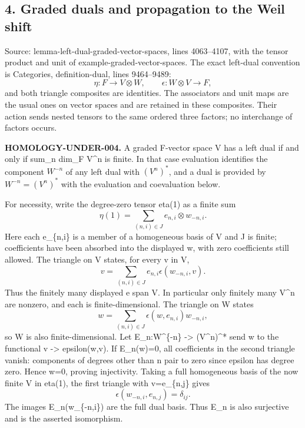 \documentclass[11pt]{article}
\begin{document}
\subsection{4. Graded duals and propagation to the Weil shift}\label{note-03-graded-duals-and-propagation-to-the-weil-shift}

Source: lemma-left-dual-graded-vector-spaces, lines 4063--4107, with the tensor product and unit of example-graded-vector-spaces. The exact left-dual convention is Categories, definition-dual, lines 9464--9489: \[
\eta:F\longrightarrow V\otimes W,\qquad
\epsilon:W\otimes V\longrightarrow F,
\] and both triangle composites are identities. The associators and unit maps are the usual ones on vector spaces and are retained in these composites. Their action sends nested tensors to the same ordered three factors; no interchange of factors occurs.

\textbf{HOMOLOGY-UNDER-004.} A graded F-vector space V has a left dual if and only if sum\_n dim\_F V\^{}n is finite. In that case evaluation identifies the component \(W^{-n}\) of any left dual with \((V^n)^*\), and a dual is provided by \(W^{-n}=(V^n)^*\) with the evaluation and coevaluation below.

For necessity, write the degree-zero tensor eta(1) as a finite sum \[
\eta(1)=\sum_{(n,i)\in J} e_{n,i}\otimes w_{-n,i}.
\] Here each e\_\{n,i\} is a member of a homogeneous basis of V and J is finite; coefficients have been absorbed into the displayed w, with zero coefficients still allowed. The triangle on V states, for every v in V, \[
v=\sum_{(n,i)\in J}e_{n,i}\epsilon(w_{-n,i},v).
\] Thus the finitely many displayed e span V. In particular only finitely many V\^{}n are nonzero, and each is finite-dimensional. The triangle on W states \[
w=\sum_{(n,i)\in J}\epsilon(w,e_{n,i})w_{-n,i},
\] so W is also finite-dimensional. Let E\_n:W\^{}\{-n\} -\textgreater{} (V\^{}n)\^{}* send w to the functional v -\textgreater{} epsilon(w,v). If E\_n(w)=0, all coefficients in the second triangle vanish: components of degrees other than n pair to zero since epsilon has degree zero. Hence w=0, proving injectivity. Taking a full homogeneous basis of the now finite V in eta(1), the first triangle with v=e\_\{n,j\} gives \[
\epsilon(w_{-n,i},e_{n,j})=\delta_{ij}.
\] The images E\_n(w\_\{-n,i\}) are the full dual basis. Thus E\_n is also surjective and is the asserted isomorphism.
\end{document}
